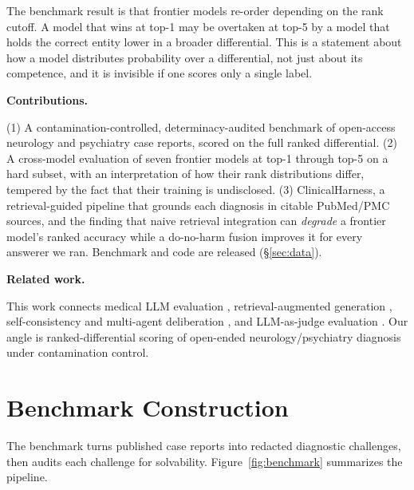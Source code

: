 \documentclass{article}
\renewcommand{\paragraph}[1]{%
  \par\addvspace{0.42\baselineskip}%
  \noindent\textbf{#1}\par\nobreak\vspace{-0.28\baselineskip}%
}
\begin{document}
The benchmark result is that frontier models re-order depending on the rank cutoff. A model that wins at
top-1 may be overtaken at top-5 by a model that holds the correct entity lower in a broader differential.
This is a statement about how a model distributes probability over a differential, not just about its
competence, and it is invisible if one scores only a single label.

\paragraph{Contributions.}
(1) A contamination-controlled, determinacy-audited benchmark of open-access neurology and psychiatry case
reports, scored on the full ranked differential. (2) A cross-model evaluation of seven frontier models at
top-1 through top-5 on a hard subset, with an interpretation of how their rank distributions differ,
tempered by the fact that their training is undisclosed. (3) ClinicalHarness, a retrieval-guided pipeline that
grounds each diagnosis in citable PubMed/PMC sources, and the finding that naive retrieval integration can
\emph{degrade} a frontier model's ranked accuracy while a do-no-harm fusion improves it for every answerer we
ran. Benchmark and code are released (\S\ref{sec:data}).

\paragraph{Related work.}
This work connects medical LLM evaluation \citep{MedPaLM,MedMCQA,PubMedQA}, retrieval-augmented generation
\citep{RAG}, self-consistency and multi-agent deliberation \citep{SelfConsistency,MultiAgentDebate}, and
LLM-as-judge evaluation \citep{GEval,JudgeBias}. Our angle is ranked-differential scoring of open-ended
neurology/psychiatry diagnosis under contamination control.

\section{Benchmark Construction}\label{sec:bench}

The benchmark turns published case reports into redacted diagnostic challenges, then audits each challenge
for solvability. Figure~\ref{fig:benchmark} summarizes the pipeline.
\end{document}
